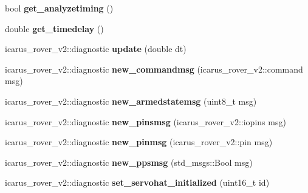 \begin{DoxyCompactItemize}
bool {\bfseries get\+\_\+analyzetiming} ()
\item 
\mbox{\label{classHatControllerNodeProcess_a620173ca545632e37563d865772c244e}} 
double {\bfseries get\+\_\+timedelay} ()
\item 
\mbox{\label{classHatControllerNodeProcess_ae3529fcddb12bc79d80a0a8e8f489c21}} 
icarus\+\_\+rover\+\_\+v2\+::diagnostic {\bfseries update} (double dt)
\item 
\mbox{\label{classHatControllerNodeProcess_a9685daf76f74b38361476c185f5ebaf1}} 
icarus\+\_\+rover\+\_\+v2\+::diagnostic {\bfseries new\+\_\+commandmsg} (icarus\+\_\+rover\+\_\+v2\+::command msg)
\item 
\mbox{\label{classHatControllerNodeProcess_a26746472378b637a661c92e6b7d6e848}} 
icarus\+\_\+rover\+\_\+v2\+::diagnostic {\bfseries new\+\_\+armedstatemsg} (uint8\+\_\+t msg)
\item 
\mbox{\label{classHatControllerNodeProcess_a46f121149e477281cd58c9c6dd4c1cdd}} 
icarus\+\_\+rover\+\_\+v2\+::diagnostic {\bfseries new\+\_\+pinsmsg} (icarus\+\_\+rover\+\_\+v2\+::iopins msg)
\item 
\mbox{\label{classHatControllerNodeProcess_a08ec03031ac750dd41207748e69312e7}} 
icarus\+\_\+rover\+\_\+v2\+::diagnostic {\bfseries new\+\_\+pinmsg} (icarus\+\_\+rover\+\_\+v2\+::pin msg)
\item 
\mbox{\label{classHatControllerNodeProcess_a45b76cda98b3bcf04102bba5a8931d1a}} 
icarus\+\_\+rover\+\_\+v2\+::diagnostic {\bfseries new\+\_\+ppsmsg} (std\+\_\+msgs\+::\+Bool msg)
\item 
\mbox{\label{classHatControllerNodeProcess_acf793fe5c3d8a54aeb7aa4de65fdb988}} 
icarus\+\_\+rover\+\_\+v2\+::diagnostic {\bfseries set\+\_\+servohat\+\_\+initialized} (uint16\+\_\+t id)
\item 
\mbox{\label{classHatControllerNodeProcess_a06606350506fed1209203cd4293a699f}} 

\end{DoxyCompactItemize}
